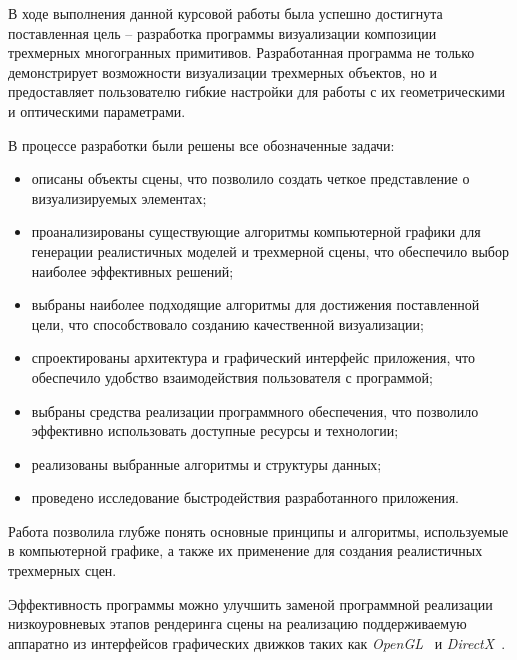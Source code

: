 
В ходе выполнения данной курсовой работы была успешно достигнута поставленная цель -- разработка программы визуализации композиции трехмерных многогранных примитивов. Разработанная программа не только демонстрирует возможности визуализации трехмерных объектов, но и предоставляет пользователю гибкие настройки для работы с их геометрическими и оптическими параметрами.

В процессе разработки были решены все обозначенные задачи:
\begin{itemize}[label=--]
	\item описаны объекты сцены, что позволило создать четкое представление о визуализируемых элементах;
	\item проанализированы существующие алгоритмы компьютерной графики для генерации реалистичных моделей и трехмерной сцены, что обеспечило выбор наиболее эффективных решений;
	\item выбраны наиболее подходящие алгоритмы для достижения поставленной цели, что способствовало созданию качественной визуализации;
	\item спроектированы архитектура и графический интерфейс приложения, что обеспечило удобство взаимодействия пользователя с программой;
	\item выбраны средства реализации программного обеспечения, что позволило эффективно использовать доступные ресурсы и технологии;
	\item реализованы выбранные алгоритмы и структуры данных;
	\item проведено исследование быстродействия разработанного приложения.
\end{itemize}

Работа позволила глубже понять основные принципы и алгоритмы, используемые в компьютерной графике, а также их применение для создания реалистичных трехмерных сцен.

Эффективность программы можно улучшить заменой программной реализации низкоуровневых этапов рендеринга сцены на реализацию поддерживаемую аппаратно из интерфейсов графических движков таких как \textit{OpenGL}~\cite{lit16} и \textit{DirectX}~\cite{lit17}.